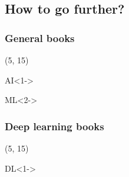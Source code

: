 \subsection{How to go further?}

\begin{frame}
  \frametitle{General books}

  \nocite{*}

  \begin{textblock}{90}(5, 15)
    \begin{block}{AI}<1->
      \printbibliography[heading=none,category=AI]
    \end{block}

    \begin{block}{\ac{ML}}<2->
      \printbibliography[heading=none,category=ML]
    \end{block}
  \end{textblock}
\end{frame}

\begin{frame}
  \frametitle{Deep learning books}

  \nocite{*}

  \begin{textblock}{90}(5, 15)
    \begin{block}{DL}<1->
      \printbibliography[heading=none,category=deep_learning]
    \end{block}
  \end{textblock}
\end{frame}

